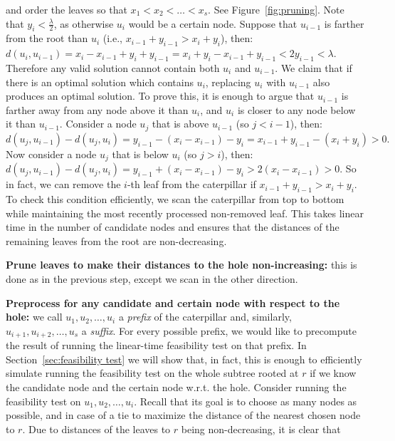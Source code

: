 \documentclass[11pt,a4paper]{article}
\newcounter{mycounter}
\newenvironment{noindlist}
 {\begin{list}{\arabic{mycounter}.~~}{\usecounter{mycounter} \labelsep=0em \labelwidth=0em \leftmargin=0em \itemindent=0em}}
 {\end{list}}
\theoremstyle{definition}
\theoremstyle{remark}
\begin{document}
\begin{noindlist}
and order the leaves so that $x_{1}<x_{2}<\ldots<x_{s}$. See Figure~\ref{fig:pruning}.
Note that $y_{i}<\frac{\lambda}{2}$, as otherwise $u_{i}$ would be a certain node.
Suppose that $u_{i-1}$ is farther from the root than $u_i$ (i.e.,
$x_{i-1}+y_{i-1} > x_i+y_i$), then:
$d(u_{i},u_{i-1}) = x_i-x_{i-1}+y_i+y_{i-1} = x_{i} + y_{i} - x_{i-1} + y_{i-1} < 2y_{i-1} < \lambda.$
Therefore any valid solution cannot contain both $u_{i}$ and $u_{i-1}$. We claim that if there is an optimal solution which contains
$u_{i}$, replacing $u_{i}$ with $u_{i-1}$ also produces an optimal solution. To prove this, it is enough to argue that
$u_{i-1}$ is farther away from any node above it than $u_i$, and $u_i$ is closer to any node below it than $u_{i-1}$.
Consider a node $u_{j}$ that is above $u_{i-1}$ (so $j<i-1$), then:
$d(u_j,u_{i-1}) - d(u_j,u_{i}) = y_{i-1}-(x_i-x_{i-1})-y_i = x_{i-1}+y_{i-1}-(x_i+y_i) > 0.$
Now consider a node $u_{j}$ that is below $u_{i}$ (so $j>i$), then:
$d(u_j,u_{i-1}) - d(u_j,u_{i}) = y_{i-1}+(x_i-x_{i-1})-y_i > 2(x_i-x_{i-1}) > 0.$
So in fact, we can remove the $i$-th leaf from the caterpillar if $x_{i-1}+y_{i-1} > x_i+y_i$.
To check this condition efficiently, we scan the caterpillar from top to bottom while maintaining the most recently processed non-removed leaf.
This takes linear time in the number of candidate nodes and ensures that the distances of the
remaining leaves from the root are non-decreasing.
\item\label{making distances from the hole monotone}
\textbf{Prune leaves to make their distances to the hole non-increasing:}
this is done as in the previous step, except we scan in the other direction.
\item\label{precompute for any candidate node}
\textbf{Preprocess for any candidate and certain node with respect to the hole:}
we call $u_{1},u_{2},\ldots,u_{i}$ a {\em prefix} of the caterpillar and, similarly, $u_{i+1},u_{i+2}, \ldots,u_{s}$ a {\em suffix}.
For every possible prefix, we would like to precompute the result of running the linear-time feasibility
test on that prefix. In Section~\ref{sec:feasibility test} we will show that, in fact, this is enough to efficiently
simulate running the feasibility test on the whole subtree rooted at $r$ if we know the candidate node and the certain node w.r.t. the hole. Consider running the feasibility test on $u_{1},u_{2},\ldots,u_{i}$.
Recall that its goal is to choose as many nodes as possible, and in case of a tie to maximize the distance of the
nearest chosen node to $r$. Due to distances of the leaves to $r$ being non-decreasing, it is clear that

\end{noindlist}
\end{document}
